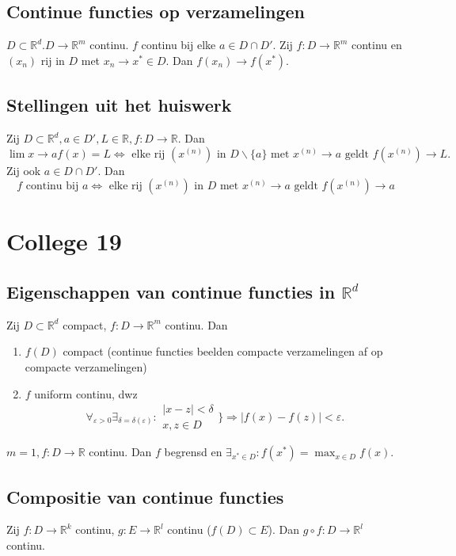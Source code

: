 \documentclass[a4paper]{exam}
\theoremstyle{definition}
\begin{document}
		\subsection{Continue functies op verzamelingen}
			$D \subset \mathbb{R}^d. D \rightarrow \mathbb{R}^m$ continu. $f$ continu bij elke $a \in D\cap D'$.
			\opm Zij $f:D\rightarrow \mathbb{R}^m$ continu en $(x_n)$ rij in $D$ met $x_n \rightarrow x^* \in D$.
			  Dan $f(x_n) \rightarrow f(x^*).$
	   \subsection{Stellingen uit het huiswerk}
            \theorem Zij $D \subset \mathbb{R}^d, a \in D', L \in \mathbb{R}, f:D \rightarrow \mathbb{R}$. Dan
            \[\lim{x \rightarrow a}f(x)=L \Leftrightarrow \text{ elke rij } (x^{(n)}) \text{ in } D \backslash \{a\} \text{ met } x^{(n)} \rightarrow a \text{ geldt } f(x^{(n)}) \rightarrow L.\]
            Zij ook $a \in D \cap D'$. Dan
            \[f \text{ continu bij } a \Leftrightarrow \text{ elke rij }(x^{(n)}) \text{ in } D \text{ met } x^{(n)} \rightarrow a \text{ geldt } f(x^{(n)}) \rightarrow a\]
	\newpage
	\section{College 19}
		\subsection{Eigenschappen van continue functies in $\mathbb{R}^d$}
			\theorem Zij $D \subset \mathbb{R}^d$ compact, $f:D\rightarrow\mathbb{R}^m$ continu. Dan
				\begin{enumerate}[(1)]
					\item $f(D)$ compact (continue functies beelden compacte verzamelingen af op compacte verzamelingen)
					\item $f$ uniform continu, dwz \[\forall _{\varepsilon >0} \exists _{\delta = \delta (\varepsilon)}: \begin{array}{lr}
						|x-z|<\delta \\
						x,z\in D
					\end{array}\bigg\}  \Rightarrow |f(x)-f(z)|<\varepsilon.\]
				\end{enumerate}
			\gevolg[1] $m=1, f:D\rightarrow \mathbb{R}$ continu. Dan $f$ begrensd en $\exists _{x^* \in D}:f(x^*)=\max_{x\in D}f(x)$.
			
		\subsection{Compositie van continue functies}
			\theorem Zij $f:D\rightarrow \mathbb{R}^k$ continu, $g:E\rightarrow \mathbb{R}^l$ continu ($f(D) \subset E$). Dan $g \circ f: D\rightarrow \mathbb{R}^l$ continu.
		
\end{document}
